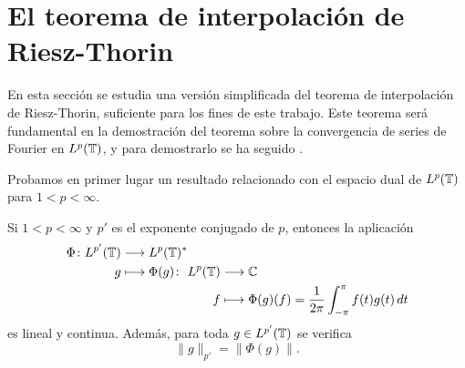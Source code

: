 \documentclass[a4paper, 12pt, oneside]{book}
\begin{document}
\section{El teorema de interpolación de Riesz-Thorin}

En esta sección se estudia una versión simplificada del teorema de interpolación de Riesz-Thorin, suficiente para los fines de este trabajo. Este teorema será fundamental en la demostración del teorema sobre la convergencia de series de Fourier en $L^p(\mathbb T)$, y para demostrarlo se ha seguido \cite{folland}.

Probamos en primer lugar un resultado relacionado con el espacio dual de $L^p(\mathbb T)$ para $1<p<\infty$.

\begin{lemma}
    Si $1 < p < \infty$ y $p'$ es el exponente conjugado de $p$, entonces la aplicación
    \[\begin{alignedat}{3}
        \Phi \colon L^{p'}(\mathbb T) &\longrightarrow L^p(\mathbb T)^* & & \\
        g &\longmapsto \Phi(g) \colon & L^p(\mathbb T) &\longrightarrow \mathbb C \\
        & & f &\longmapsto \Phi(g)(f)=\frac{1}{2\pi}\int_{-\pi}^{\pi} f(t)g(t) \, dt
    \end{alignedat}\]
    es lineal y continua. Además, para toda $g \in L^{p'}(\mathbb T)$ se verifica
    \[\|g\|_{p'} = \|\Phi(g)\|.\]
\end{lemma}
\end{document}
